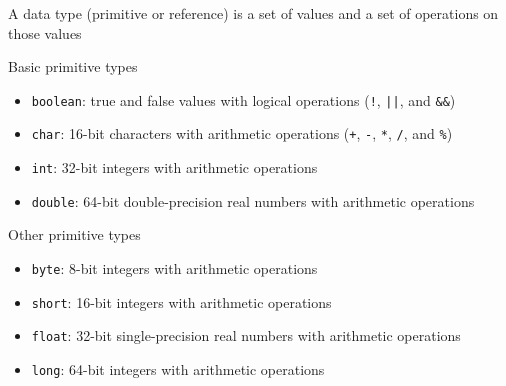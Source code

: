 \documentclass[8pt,a4paper,compress]{beamer}
\begin{document}
\begin{frame}[fragile]
\pause

A data type (primitive or reference) is a set of values and a set of operations on those values

\pause
\bigskip

Basic primitive types
\begin{itemize}
\item \lstinline{boolean}: true and false values with logical operations (\lstinline{!}, \lstinline{||}, and \lstinline{&&})
\item \lstinline{char}: 16-bit characters with arithmetic operations (\lstinline{+}, \lstinline{-}, \lstinline{*}, \lstinline{/}, and \lstinline{%})
\item \lstinline{int}: 32-bit integers with arithmetic operations
\item \lstinline{double}: 64-bit double-precision real numbers with arithmetic operations
\end{itemize}

\pause
\bigskip

Other primitive types
\begin{itemize}
\item \lstinline{byte}: 8-bit integers with arithmetic operations
\item \lstinline{short}: 16-bit integers with arithmetic operations
\item \lstinline{float}: 32-bit single-precision real numbers with arithmetic operations
\item \lstinline{long}: 64-bit integers with arithmetic operations
\end{itemize}
\end{frame}
\end{document}
